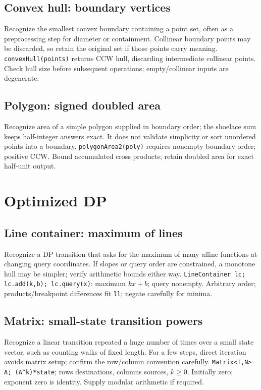 \subsection{Convex hull: boundary vertices}
Recognize the smallest convex boundary containing a point set, often as a
preprocessing step for diameter or containment. Collinear boundary points
may be discarded, so retain the original set if those points carry meaning.
\texttt{convexHull(points)} returns CCW hull, discarding intermediate collinear points.
Check hull size before subsequent operations; empty/collinear inputs are degenerate.

\subsection{Polygon: signed doubled area}
Recognize area of a simple polygon supplied in boundary order; the shoelace
sum keeps half-integer answers exact. It does not validate simplicity or sort
unordered points into a boundary.
\texttt{polygonArea2(poly)} requires nonempty boundary order; positive CCW.
Bound accumulated cross products; retain doubled area for exact half-unit output.

\section{Optimized DP}
\subsection{Line container: maximum of lines}
Recognize a DP transition that asks for the maximum of many affine functions
at changing query coordinates. If slopes or query order are constrained, a
monotone hull may be simpler; verify arithmetic bounds either way.
\texttt{LineContainer lc; lc.add(k,b); lc.query(x)}: maximum $kx+b$; query nonempty.
Arbitrary order; products/breakpoint differences fit \texttt{ll}; negate carefully for minima.

\subsection{Matrix: small-state transition powers}
Recognize a linear transition repeated a huge number of times over a small
state vector, such as counting walks of fixed length. For a few steps, direct
iteration avoids matrix setup; confirm the row/column convention carefully.
\texttt{Matrix<T,N> A; (A\^{}k)*state}; rows destinations, columns sources, $k\ge0$.
Initially zero; exponent zero is identity. Supply modular arithmetic if required.
